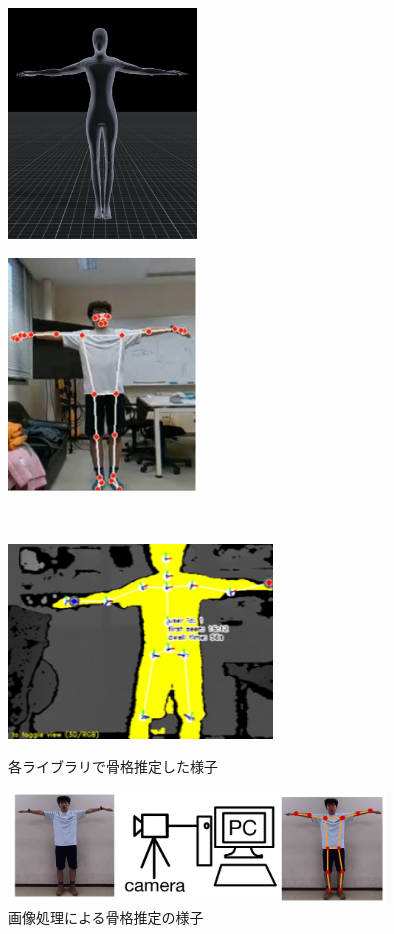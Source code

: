\documentclass[a4j, fleqn, 12pt]{jsreport}
\begin{document}
\begin{figure}[t]
  \centering
  \begin{minipage}[]{0.45\hsize}
    \centering
    \includegraphics[width=5cm]{img/mocopi_uu.png}
    \label{mocopi_uu}
  \end{minipage}
  \begin{minipage}[]{0.45\hsize}
    \centering
    \includegraphics[width=5cm]{img/media_uu.png}
    \label{RGB_uu}
  \end{minipage}\\
  \begin{minipage}[]{0.45\hsize}
    \centering
    \includegraphics[width=7cm]{img/nuitrack_uu.png}
    \label{RGBD_uu}
  \end{minipage}
  \caption{各ライブラリで骨格推定した様子}
  \label{sokutei_uu}
\end{figure}
\begin{figure}[b]
  \centering
  \includegraphics[width=10cm]{img/image_3D.png}
  \caption{画像処理による骨格推定の様子}
  \label{image_3D}
\end{figure}
\end{document}
